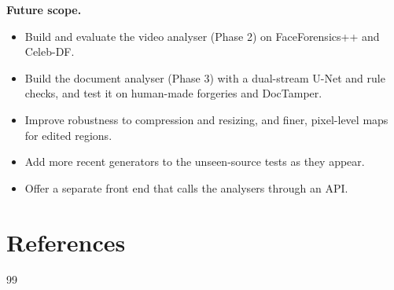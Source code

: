 \documentclass[12pt,a4paper]{article}
\begin{document}
\textbf{Future scope.}
\begin{itemize}
  \item Build and evaluate the video analyser (Phase 2) on FaceForensics++ and Celeb-DF.
  \item Build the document analyser (Phase 3) with a dual-stream U-Net and rule checks, and test it on human-made forgeries and DocTamper.
  \item Improve robustness to compression and resizing, and finer, pixel-level maps for edited regions.
  \item Add more recent generators to the unseen-source tests as they appear.
  \item Offer a separate front end that calls the analysers through an API.
\end{itemize}

\section{References}
\begingroup
\small
\renewcommand{\section}[2]{}   %
\begin{thebibliography}{99}

\end{thebibliography}
\endgroup
\end{document}
